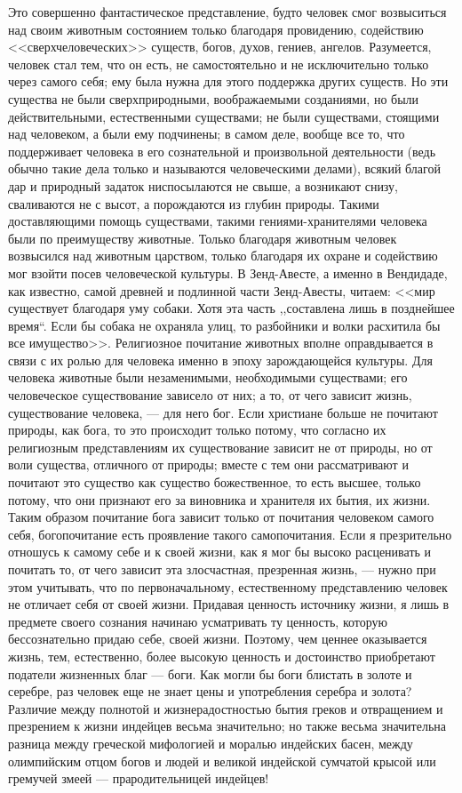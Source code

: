 \documentclass[12pt]{article}
\begin{document}
Это совершенно фантастическое представление, будто человек смог возвыситься над своим животным состоянием только благодаря провидению, содействию <<сверхчеловеческих>> существ, богов, духов, гениев, ангелов. Разумеется, человек стал тем, что он есть, не самостоятельно и не исключительно только через самого себя; ему была нужна для этого поддержка других существ. Но эти существа не были сверхприродными, воображаемыми созданиями, но были действительными, естественными существами; не были существами, стоящими над человеком, а были ему подчинены; в самом деле, вообще все то, что поддерживает человека в его сознательной и произвольной деятельности (ведь обычно такие дела только и называются человеческими делами), всякий благой дар и природный задаток ниспосылаются не свыше, а возникают снизу, сваливаются не с высот, а порождаются из глубин природы. Такими доставляющими помощь существами, такими гениями-хранителями человека были по преимуществу животные. Только благодаря животным человек возвысился над животным царством, только благодаря их охране и содействию мог взойти посев человеческой культуры. В Зенд-Авесте, а именно в Вендидаде, как известно, самой древней и подлинной части Зенд-Авесты, читаем: <<мир существует благодаря уму собаки. Хотя эта часть ,,составлена лишь в позднейшее время``. Если бы собака не охраняла улиц, то разбойники и волки расхитила бы все имущество>>. Религиозное почитание животных вполне оправдывается в связи с их ролью для человека именно в эпоху зарождающейся культуры. Для человека животные были незаменимыми, необходимыми существами; его человеческое существование зависело от них; а то, от чего зависит жизнь, существование человека, --- для него бог. Если христиане больше не почитают природы, как бога, то это происходит только потому, что согласно их религиозным представлениям их существование зависит не от природы, но от воли существа, отличного от природы; вместе с тем они рассматривают и почитают это существо как существо божественное, то есть высшее, только потому, что они признают его за виновника и хранителя их бытия, их жизни. Таким образом почитание бога зависит только от почитания человеком самого себя, богопочитание есть проявление такого самопочитания. Если я презрительно отношусь к самому себе и к своей жизни, как я мог бы высоко расценивать и почитать то, от чего зависит эта злосчастная, презренная жизнь, --- нужно при этом учитывать, что по первоначальному, естественному представлению человек не отличает себя от своей жизни. Придавая ценность источнику жизни, я лишь в предмете своего сознания начинаю усматривать ту ценность, которую бессознательно придаю себе, своей жизни. Поэтому, чем ценнее оказывается жизнь, тем, естественно, более высокую ценность и достоинство приобретают податели жизненных благ --- боги. Как могли бы боги блистать в золоте и серебре, раз человек еще не знает цены и употребления серебра и золота? Различие между полнотой и жизнерадостностью бытия греков и отвращением и презрением к жизни индейцев весьма значительно; но также весьма значительна разница между греческой мифологией и моралью индейских басен, между олимпийским отцом богов и людей и великой индейской сумчатой крысой или гремучей змеей --- прародительницей индейцев!
\end{document}
